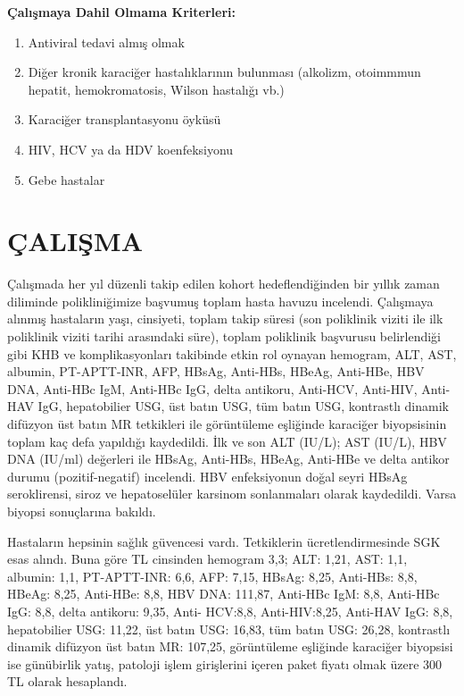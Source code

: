\textbf{Çalışmaya Dahil Olmama Kriterleri:}

\begin{enumerate}
\item Antiviral tedavi almış olmak
\item Diğer kronik karaciğer hastalıklarının bulunması (alkolizm, otoimmmun hepatit, hemokromatosis, Wilson hastalığı vb.)
\item Karaciğer transplantasyonu öyküsü
\item HIV, HCV ya da HDV koenfeksiyonu
\item Gebe hastalar
\end{enumerate}


\section{ÇALIŞMA} Çalışmada her yıl düzenli takip edilen kohort hedeflendiğinden bir yıllık zaman diliminde polikliniğimize başvumuş toplam hasta havuzu incelendi. Çalışmaya alınmış hastaların yaşı, cinsiyeti, toplam takip süresi (son poliklinik viziti ile ilk poliklinik viziti tarihi arasındaki süre), toplam poliklinik başvurusu belirlendiği gibi KHB ve komplikasyonları takibinde etkin rol oynayan hemogram, ALT, AST, albumin, PT-APTT-INR, AFP, HBsAg, Anti-HBs, HBeAg, Anti-HBe, HBV DNA, Anti-HBc IgM, Anti-HBc IgG, delta antikoru, Anti-HCV, Anti-HIV, Anti-HAV IgG, hepatobilier USG, üst batın USG, tüm batın USG, kontrastlı dinamik difüzyon üst batın MR tetkikleri ile görüntüleme eşliğinde karaciğer biyopsisinin toplam kaç defa yapıldığı kaydedildi. İlk ve son ALT (IU/L); AST (IU/L), HBV DNA (IU/ml) değerleri ile HBsAg,  Anti-HBs, HBeAg, Anti-HBe ve delta antikor durumu (pozitif-negatif) incelendi. HBV enfeksiyonun doğal seyri HBsAg seroklirensi, siroz ve hepatoselüler karsinom sonlanmaları olarak kaydedildi. Varsa biyopsi sonuçlarına bakıldı. 

Hastaların hepsinin sağlık güvencesi vardı. Tetkiklerin ücretlendirmesinde SGK esas alındı. Buna göre TL cinsinden hemogram 3,3; ALT: 1,21, AST: 1,1, albumin: 1,1, PT-APTT-INR: 6,6, AFP: 7,15, HBsAg: 8,25, Anti-HBs: 8,8, HBeAg: 8,25, Anti-HBe: 8,8, HBV DNA: 111,87, Anti-HBc IgM: 8,8, Anti-HBc IgG: 8,8, delta antikoru: 9,35, Anti- HCV:8,8, Anti-HIV:8,25, Anti-HAV IgG: 8,8, hepatobilier USG: 11,22, üst batın USG: 16,83, tüm batın USG: 26,28, kontrastlı dinamik difüzyon üst batın MR: 107,25, görüntüleme eşliğinde karaciğer biyopsisi ise günübirlik yatış, patoloji işlem girişlerini içeren paket fiyatı olmak üzere 300 TL olarak hesaplandı. 


